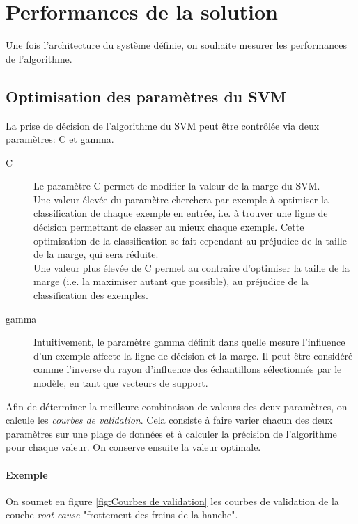 \section{Performances de la solution}
\label{Automatisation du processus d'investigation: Performances de la solution}
Une fois l'architecture du système définie, on souhaite mesurer les performances de l'algorithme.

\subsection{Optimisation des paramètres du SVM}
\label{Industrialisation du produit: Performances de la solution:Optimisation des paramètres du SVM}
La prise de décision de l'algorithme du SVM peut être contrôlée via deux paramètres: C et gamma.
\begin{description}
	\item [C] Le paramètre C permet de modifier la valeur de la marge du SVM. \\
	Une valeur élevée du paramètre cherchera par exemple à optimiser la classification de chaque exemple en entrée, i.e. à trouver une ligne de décision permettant de classer au mieux chaque exemple. Cette optimisation de la classification se fait cependant au préjudice de la taille de la marge, qui sera réduite. \\
	Une valeur plus élevée de C permet au contraire d'optimiser la taille de la marge (i.e. la maximiser autant que possible), au préjudice de la classification des exemples.
	\item [gamma] Intuitivement, le paramètre gamma définit dans quelle mesure l'influence d'un exemple affecte la ligne de décision et la marge. Il peut être considéré comme l'inverse du rayon d'influence des échantillons sélectionnés par le modèle, en tant que vecteurs de support.
\end{description}

Afin de déterminer la meilleure combinaison de valeurs des deux paramètres, on calcule les \emph{courbes de validation}. Cela consiste à faire varier chacun des deux paramètres sur une plage de données et à calculer la précision de l'algorithme pour chaque valeur. On conserve ensuite la valeur optimale. 

 \paragraph{Exemple}
 On soumet en figure \ref{fig:Courbes de validation} les courbes de validation de la couche \emph{root cause} "frottement des freins de la hanche". 

